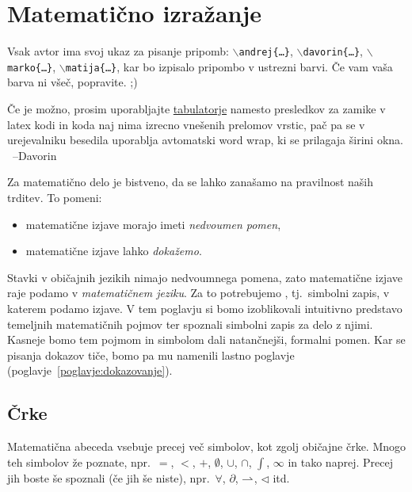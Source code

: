 \chapter{Matematično izražanje}\label{poglavje:matematicno-izrazanje}


        \alert{Vsak avtor ima svoj ukaz za pisanje pripomb: \textcolor{andrejcolor}{\texttt{$\backslash$andrej\{\ldots\}}}, \textcolor{davorincolor}{\texttt{$\backslash$davorin\{\ldots\}}}, \textcolor{markocolor}{\texttt{$\backslash$marko\{\ldots\}}}, \textcolor{matijacolor}{\texttt{$\backslash$matija\{\ldots\}}}, kar bo izpisalo pripombo v ustrezni barvi. Če vam vaša barva ni všeč, popravite. ;)}


        \alert{Če je možno, prosim uporabljajte \uline{tabulatorje} namesto presledkov za zamike v latex kodi in koda naj nima izrecno vnešenih prelomov vrstic, pač pa se v urejevalniku besedila uporablja avtomatski word wrap, ki se prilagaja širini okna. \ --Davorin}

        Za matematično delo je bistveno, da se lahko zanašamo na pravilnost naših trditev. To pomeni:
        \begin{itemize}
                \item
                        matematične izjave morajo imeti \emph{nedvoumen pomen},
                \item
                        matematične izjave lahko \emph{dokažemo}.
        \end{itemize}

        Stavki v običajnih jezikih nimajo nedvoumnega pomena, zato matematične izjave raje podamo v \emph{matematičnem jeziku}. Za to potrebujemo , tj.~simbolni zapis, v katerem podamo izjave. V tem poglavju si bomo izoblikovali intuitivno predstavo temeljnih matematičnih pojmov ter spoznali simbolni zapis za delo z njimi. Kasneje bomo tem pojmom in simbolom dali natančnejši, formalni pomen. Kar se pisanja dokazov tiče, bomo pa mu namenili lastno poglavje (poglavje~\ref{poglavje:dokazovanje}).


        \section{Črke}

                Matematična abeceda vsebuje precej več simbolov, kot zgolj običajne črke. Mnogo teh simbolov že poznate, npr.~$=$, $<$, $+$, $\emptyset$, $\cup$, $\cap$, $\int$, $\infty$ in tako naprej. Precej jih boste še spoznali (če jih še niste), npr.~$\forall$, $\partial$, $\mathrel{\rightharpoonup}$, $\lhd$ itd.

